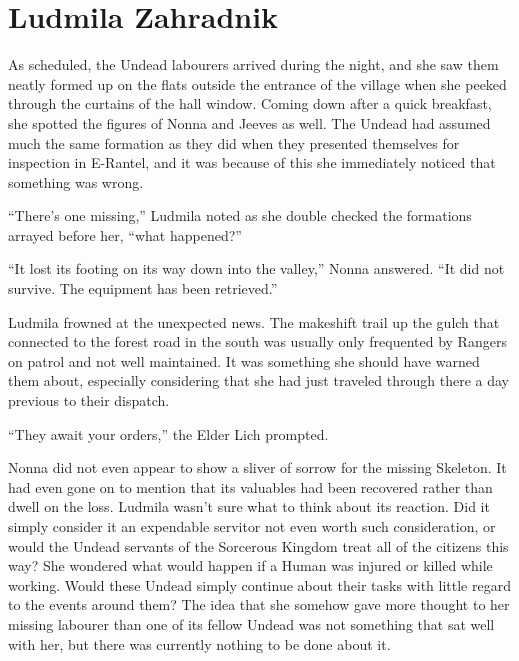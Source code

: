 \chapter{Ludmila Zahradnik}

As scheduled, the Undead labourers arrived during the night, and she saw them neatly formed up on the flats outside the entrance of the village when she peeked through the curtains of the hall window. Coming down after a quick breakfast, she spotted the figures of Nonna and Jeeves as well. The Undead had assumed much the same formation as they did when they presented themselves for inspection in E-Rantel, and it was because of this she immediately noticed that something was wrong.

 

“There’s one missing,” Ludmila noted as she double checked the formations arrayed before her, “what happened?”

 

“It lost its footing on its way down into the valley,” Nonna answered. “It did not survive. The equipment has been retrieved.”

 

Ludmila frowned at the unexpected news. The makeshift trail up the gulch that connected to the forest road in the south was usually only frequented by Rangers on patrol and not well maintained. It was something she should have warned them about, especially considering that she had just traveled through there a day previous to their dispatch.

 

“They await your orders,” the Elder Lich prompted.

 

Nonna did not even appear to show a sliver of sorrow for the missing Skeleton. It had even gone on to mention that its valuables had been recovered rather than dwell on the loss. Ludmila wasn’t sure what to think about its reaction. Did it simply consider it an expendable servitor not even worth such consideration, or would the Undead servants of the Sorcerous Kingdom treat all of the citizens this way? She wondered what would happen if a Human was injured or killed while working. Would these Undead simply continue about their tasks with little regard to the events around them? The idea that she somehow gave more thought to her missing labourer than one of its fellow Undead was not something that sat well with her, but there was currently nothing to be done about it.

 

